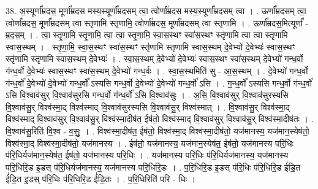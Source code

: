 \documentclass[17pt]{extarticle}
\begin{document}
38. अ॒स्यूर्णा᳚म्रदस॒ मूर्णा᳚म्रदस मस्य॒स्यूर्णा᳚म्रदसम् त्वा॒ त्वोर्णा᳚म्रदस मस्य॒स्यूर्णा᳚म्रदसम् त्वा । . ऊर्णा᳚म्रदसम् त्वा॒ त्वोर्णा᳚म्रदस॒ मूर्णा᳚म्रदसम् त्वा स्तृणामि स्तृणामि॒ त्वोर्णा᳚म्रदस॒ मूर्णा᳚म्रदसम् त्वा स्तृणामि । . ऊर्णा᳚म्रदस॒मित्यूर्णा᳚ - म्र॒द॒स॒म् । . त्वा॒ स्तृ॒णा॒मि॒ स्तृ॒णा॒मि॒ त्वा॒ त्वा॒ स्तृ॒णा॒मि॒ स्वा॒स॒स्थꣳ स्वा॑स॒स्थꣳ स्तृ॑णामि त्वा त्वा स्तृणामि स्वास॒स्थम् । . स्तृ॒णा॒मि॒ स्वा॒स॒स्थꣳ स्वा॑स॒स्थꣳ स्तृ॑णामि स्तृणामि स्वास॒स्थम् दे॒वेभ्यो॑ दे॒वेभ्यः॑ स्वास॒स्थꣳ स्तृ॑णामि स्तृणामि स्वास॒स्थम् दे॒वेभ्यः॑ । . स्वा॒स॒स्थम् दे॒वेभ्यो॑ दे॒वेभ्यः॑ स्वास॒स्थꣳ स्वा॑स॒स्थम् दे॒वेभ्यो॑ गन्ध॒र्वो ग॑न्ध॒र्वो दे॒वेभ्यः॑ स्वास॒स्थꣳ स्वा॑स॒स्थम् दे॒वेभ्यो॑ गन्ध॒र्वः । . स्वा॒स॒स्थमिति॑ सु - आ॒स॒स्थम् । . दे॒वेभ्यो॑ गन्ध॒र्वो ग॑न्ध॒र्वो॑ दे॒वेभ्यो॑ दे॒वेभ्यो॑ गन्ध॒र्वो᳚ ऽस्यसि गन्ध॒र्वो दे॒वेभ्यो॑ दे॒वेभ्यो॑ गन्ध॒र्वो॑ ऽसि । . ग॒न्ध॒र्वो᳚ ऽस्यसि गन्ध॒र्वो ग॑न्ध॒र्वो॑ ऽसि वि॒श्वाव॑सुर् वि॒श्वाव॑सुरसि गन्ध॒र्वो ग॑न्ध॒र्वो॑ ऽसि वि॒श्वाव॑सुः । . अ॒सि॒ वि॒श्वाव॑सुर् वि॒श्वाव॑सुरस्यसि वि॒श्वाव॑सु॒र् विश्व॑स्मा॒द् विश्व॑स्माद् वि॒श्वाव॑सुरस्यसि वि॒श्वाव॑सु॒र् विश्व॑स्मात् । . वि॒श्वाव॑सु॒र् विश्व॑स्मा॒द् विश्व॑स्माद् वि॒श्वाव॑सुर् वि॒श्वाव॑सु॒र् विश्व॑स्मा॒दीष॑त॒ ईष॑तो॒ विश्व॑स्माद् वि॒श्वाव॑सुर् वि॒श्वाव॑सु॒र् विश्व॑स्मा॒दीष॑तः । . वि॒श्वाव॑सु॒रिति॑ वि॒श्व - व॒सुः॒ । . विश्व॑स्मा॒दीष॑त॒ ईष॑तो॒ विश्व॑स्मा॒द् विश्व॑स्मा॒दीष॑तो॒ यज॑मानस्य॒ यज॑मान॒स्येष॑तो॒ विश्व॑स्मा॒द् विश्व॑स्मा॒दीष॑तो॒ यज॑मानस्य । . ईष॑तो॒ यज॑मानस्य॒ यज॑मान॒स्येष॑त॒ ईष॑तो॒ यज॑मानस्य परि॒धिः प॑रि॒धिर्यज॑मान॒स्येष॑त॒ ईष॑तो॒ यज॑मानस्य परि॒धिः । . यज॑मानस्य परि॒धिः प॑रि॒धिर्यज॑मानस्य॒ यज॑मानस्य परि॒धिरि॒ड इ॒डस् प॑रि॒धिर्यज॑मानस्य॒ यज॑मानस्य परि॒धिरि॒डः । . प॒रि॒धिरि॒ड इ॒डस् प॑रि॒धिः प॑रि॒धिरि॒ड ई॑डि॒त ई॑डि॒त इ॒डस् प॑रि॒धिः प॑रि॒धिरि॒ड ई॑डि॒तः । . प॒रि॒धिरिति॑ परि - धिः । \newline
\end{document}

